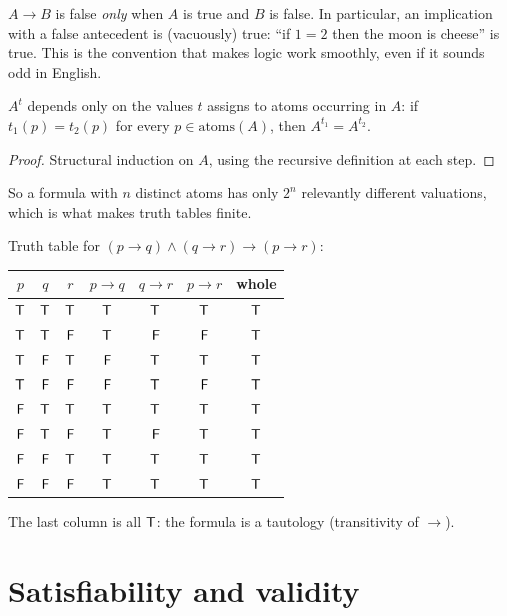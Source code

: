 \begin{important}
$A\to B$ is false \emph{only} when $A$ is true and $B$ is false. In particular, an
implication with a false antecedent is (vacuously) true: ``if $1=2$ then the moon is
cheese'' is true. This is the convention that makes logic work smoothly, even if it
sounds odd in English.
\end{important}

\begin{lemma}[Relevance]
$A^t$ depends only on the values $t$ assigns to atoms occurring in $A$: if $t_1(p)=t_2(p)$
for every $p\in\mathrm{atoms}(A)$, then $A^{t_1}=A^{t_2}$.
\end{lemma}
\begin{proof}
Structural induction on $A$, using the recursive definition at each step.
\end{proof}

So a formula with $n$ distinct atoms has only $2^n$ relevantly different valuations,
which is what makes truth tables finite.

\begin{example}
Truth table for $(p\to q)\land(q\to r)\to(p\to r)$:
\begin{center}
\begin{tabular}{ccc|cccc}
$p$&$q$&$r$& $p\to q$ & $q\to r$ & $p\to r$ & whole\\\hline
$\mathsf{T}$&$\mathsf{T}$&$\mathsf{T}$&$\mathsf{T}$&$\mathsf{T}$&$\mathsf{T}$&$\mathsf{T}$\\
$\mathsf{T}$&$\mathsf{T}$&$\mathsf{F}$&$\mathsf{T}$&$\mathsf{F}$&$\mathsf{F}$&$\mathsf{T}$\\
$\mathsf{T}$&$\mathsf{F}$&$\mathsf{T}$&$\mathsf{F}$&$\mathsf{T}$&$\mathsf{T}$&$\mathsf{T}$\\
$\mathsf{T}$&$\mathsf{F}$&$\mathsf{F}$&$\mathsf{F}$&$\mathsf{T}$&$\mathsf{F}$&$\mathsf{T}$\\
$\mathsf{F}$&$\mathsf{T}$&$\mathsf{T}$&$\mathsf{T}$&$\mathsf{T}$&$\mathsf{T}$&$\mathsf{T}$\\
$\mathsf{F}$&$\mathsf{T}$&$\mathsf{F}$&$\mathsf{T}$&$\mathsf{F}$&$\mathsf{T}$&$\mathsf{T}$\\
$\mathsf{F}$&$\mathsf{F}$&$\mathsf{T}$&$\mathsf{T}$&$\mathsf{T}$&$\mathsf{T}$&$\mathsf{T}$\\
$\mathsf{F}$&$\mathsf{F}$&$\mathsf{F}$&$\mathsf{T}$&$\mathsf{T}$&$\mathsf{T}$&$\mathsf{T}$\\
\end{tabular}
\end{center}
The last column is all $\mathsf{T}$: the formula is a tautology (transitivity of $\to$).
\end{example}

\section{Satisfiability and validity}

